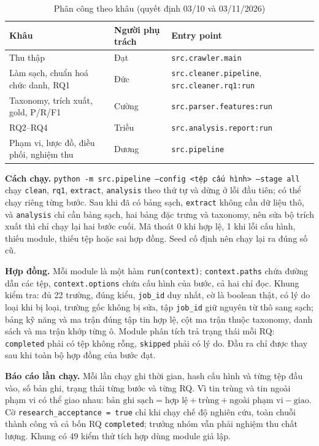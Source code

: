 \documentclass[12pt]{article}
\newcommand{\code}[1]{\texttt{#1}}
\begin{document}
\begin{table}[htbp]
\centering
\caption{Phân công theo khâu (quyết định 03/10 và 03/11/2026)}
\label{tab:owners}
\renewcommand{\arraystretch}{1.15}
\begin{tabularx}{\textwidth}{>{\raggedright\arraybackslash}p{4.6cm} l X}
\toprule
\textbf{Khâu} & \textbf{Người phụ trách} & \textbf{Entry point} \\
\midrule
Thu thập & Đạt & \code{src.crawler.main} \\
Làm sạch, chuẩn hoá chức danh, RQ1 & Đức & \code{src.cleaner.pipeline}, \code{src.cleaner.rq1:run} \\
Taxonomy, trích xuất, gold, P/R/F1 & Cường & \code{src.parser.features:run} \\
RQ2--RQ4 & Triều & \code{src.analysis.report:run} \\
Phạm vi, lược đồ, điều phối, nghiệm thu & Dương & \code{src.pipeline} \\
\bottomrule
\end{tabularx}
\end{table}

\textbf{Cách chạy.} \code{python -m src.pipeline --config <tệp cấu hình> --stage all} chạy \code{clean}, \code{rq1}, \code{extract}, \code{analysis} theo thứ tự và dừng ở lỗi đầu tiên; có thể chạy riêng từng bước. Sau khi đã có bảng sạch, \code{extract} không cần dữ liệu thô, và \code{analysis} chỉ cần bảng sạch, hai bảng đặc trưng và taxonomy, nên sửa bộ trích xuất thì chỉ chạy lại hai bước cuối. Mã thoát 0 khi hợp lệ, 1 khi lỗi cấu hình, thiếu module, thiếu tệp hoặc sai hợp đồng. Seed cố định nên chạy lại ra đúng số cũ.

\textbf{Hợp đồng.} Mỗi module là một hàm \code{run(context)}; \code{context.paths} chứa đường dẫn các tệp, \code{context.options} chứa cấu hình của bước, cả hai chỉ đọc. Khung kiểm tra: đủ 22 trường, đúng kiểu, \code{job\_id} duy nhất, cờ là boolean thật, có lý do loại khi bị loại, trường gốc không bị sửa, tập \code{job\_id} giữ nguyên từ thô sang sạch; bảng kỹ năng và ma trận đúng tập tin hợp lệ, cột ma trận thuộc taxonomy, danh sách và ma trận khớp từng ô. Module phân tích trả trạng thái mỗi RQ: \code{completed} phải có tệp không rỗng, \code{skipped} phải có lý do. Đầu ra chỉ được thay sau khi toàn bộ hợp đồng của bước đạt.

\textbf{Báo cáo lần chạy.} Mỗi lần chạy ghi thời gian, hash cấu hình và từng tệp đầu vào, số bản ghi, trạng thái từng bước và từng RQ. Vì tin trùng và tin ngoài phạm vi có thể giao nhau: $\text{bản ghi sạch} = \text{hợp lệ} + \text{trùng} + \text{ngoài phạm vi} - \text{giao}$. Cờ \code{research\_acceptance = true} chỉ khi chạy chế độ nghiên cứu, toàn chuỗi thành công và cả bốn RQ \code{completed}; trưởng nhóm vẫn phải nghiệm thu chất lượng. Khung có 49 kiểm thử tích hợp dùng module giả lập.
\end{document}
